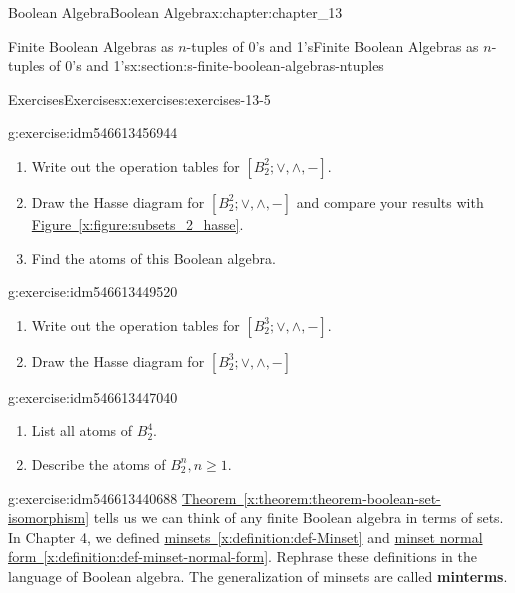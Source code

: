 \documentclass[oneside,10pt,]{book}
\newcommand{\xreffont}{\relax}
\newcommand{\terminology}[1]{\textbf{#1}}
\numberwithin{equation}{section}
\begin{document}
\begin{chapterptx}{Boolean Algebra}{}{Boolean Algebra}{}{}{x:chapter:chapter_13}
\begin{sectionptx}{Finite Boolean Algebras as \(n\)-tuples of 0's and 1's}{}{Finite Boolean Algebras as \(n\)-tuples of 0's and 1's}{}{}{x:section:s-finite-boolean-algebras-ntuples}
\begin{exercises-subsection}{Exercises}{}{Exercises}{}{}{x:exercises:exercises-13-5}
\begin{divisionexercise}{1}{}{}{g:exercise:idm546613456944}%
%
\begin{enumerate}[label=(\alph*)]
\item{}Write out the operation tables for \(\left[B_2^2; \lor , \land, - \right].\)%
\item{}Draw the Hasse diagram for \(\left[B_2^2; \lor , \land, - \right]\) and compare your results with  \hyperref[x:figure:subsets_2_hasse]{Figure~{\xreffont\ref{x:figure:subsets_2_hasse}}}.%
\item{}Find the atoms of this Boolean algebra.%
\end{enumerate}
%
\end{divisionexercise}%
\begin{divisionexercise}{2}{}{}{g:exercise:idm546613449520}%
%
\begin{enumerate}[label=(\alph*)]
\item{}Write out the operation tables for \(\left[B_2^3; \lor , \land, - \right].\)%
\item{}Draw the Hasse diagram for \(\left[B_2^3; \lor , \land , - \right]\)%
\end{enumerate}
%
\end{divisionexercise}%
\begin{divisionexercise}{3}{}{}{g:exercise:idm546613447040}%
%
\begin{enumerate}[label=(\alph*)]
\item{}List all atoms of \(B_2^4\).%
\item{}Describe the atoms of \(B_2^n, n \geq 1\).%
\end{enumerate}
%
\end{divisionexercise}%
\begin{divisionexercise}{4}{}{}{g:exercise:idm546613440688}%
\hyperref[x:theorem:theorem-boolean-set-isomorphism]{Theorem~{\xreffont\ref{x:theorem:theorem-boolean-set-isomorphism}}} tells us we can think of any finite Boolean algebra in terms of sets. In Chapter 4,  we defined  \hyperref[x:definition:def-Minset]{minsets~{\xreffont\ref{x:definition:def-Minset}}} and \hyperref[x:definition:def-minset-normal-form]{minset normal form~{\xreffont\ref{x:definition:def-minset-normal-form}}}.  Rephrase these definitions in the language of Boolean algebra. The generalization of minsets are called \terminology{minterms}.%
\end{divisionexercise}%
\end{exercises-subsection}
\end{sectionptx}

\end{chapterptx}
\end{document}
